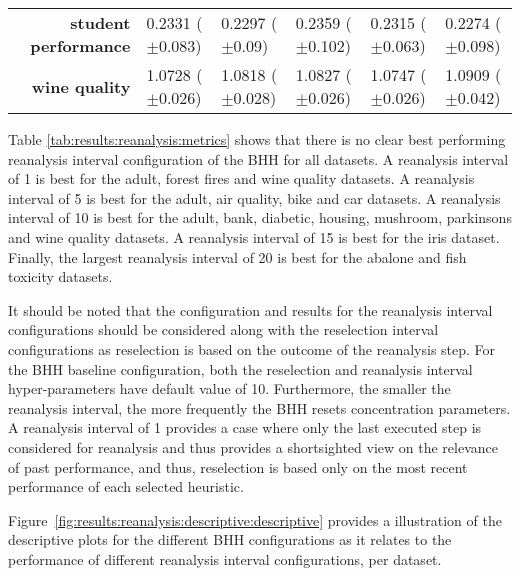 \begin{table}[htbp]
{\begin{tabular}{r|lllll}
			\textbf{student performance} & \cellcolor[rgb]{ .992,  .741,  .486}0.2331 ($\pm$0.083) & \cellcolor[rgb]{ .725,  .839,  .498}0.2297 ($\pm$0.09)  & \cellcolor[rgb]{ .973,  .412,  .42}0.2359 ($\pm$0.102)  & \cellcolor[rgb]{ 1,  .922,  .518}0.2315 ($\pm$0.063)   & \cellcolor[rgb]{ .388,  .745,  .482}0.2274 ($\pm$0.098) \\
			\textbf{wine quality}        & \cellcolor[rgb]{ .388,  .745,  .482}1.0728 ($\pm$0.026) & \cellcolor[rgb]{ 1,  .922,  .518}1.0818 ($\pm$0.028)    & \cellcolor[rgb]{ 1,  .871,  .51}1.0827 ($\pm$0.026)     & \cellcolor[rgb]{ .514,  .78,  .486}1.0747 ($\pm$0.026) & \cellcolor[rgb]{ .973,  .412,  .42}1.0909 ($\pm$0.042)  \\
		\end{tabular}%


	}

\end{table}%

Table \ref{tab:results:reanalysis:metrics} shows that there is no clear best performing reanalysis interval configuration of the \acs{BHH} for all datasets. A reanalysis interval of 1 is best for the adult, forest fires and wine quality datasets. A reanalysis interval of 5 is best for the adult, air quality, bike and car datasets. A reanalysis interval of 10 is best for the adult, bank, diabetic, housing, mushroom, parkinsons and wine quality datasets. A reanalysis interval of 15 is best for the iris dataset. Finally, the largest reanalysis interval of 20 is best for the abalone and fish toxicity datasets.

It should be noted that the configuration and results for the reanalysis interval configurations should be considered along with the reselection interval configurations as reselection is based on the outcome of the reanalysis step. For the \acs{BHH} baseline configuration, both the reselection and reanalysis interval hyper-parameters have default value of 10. Furthermore, the smaller the reanalysis interval, the more frequently the \acs{BHH} resets concentration parameters. A reanalysis interval of 1 provides a case where only the last executed step is considered for reanalysis and thus provides a shortsighted view on the relevance of past performance, and thus, reselection is based only on the most recent performance of each selected heuristic.

Figure~\ref{fig:results:reanalysis:descriptive:descriptive} provides a illustration of the descriptive plots for the different \acs{BHH} configurations as it relates to the performance of different reanalysis interval configurations, per dataset.

